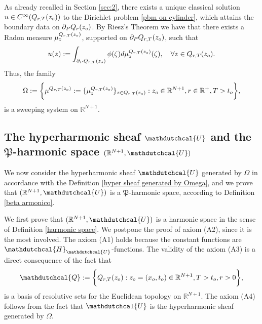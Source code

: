 \documentclass{amsart}
\numberwithin{equation}{section}
\def \p{{\phi}}
\def \r{{\mathbb{R}}}
\def \Hd{{\mathdutchcal{H}}}
\def \Ud{{\mathdutchcal{U}}}
\begin{document}
{As already recalled in Section \ref{sec:2}, there exists a unique classical solution $u \in {C}^\infty ({Q}_{r,T}(z_{\rm o}))$ to the Dirichlet problem \eqref{pbm on cylinder}, which attains the boundary data on $\partial_P {Q}_r(z_{\rm o})$. By Riesz's Theorem we have that there exists a Radon measure $\mu^{{Q}_{r,T}(z_{\rm o})}_z$, supported on $\partial_P{Q}_{r,T}(z_{\rm o})$, such that 
\begin{equation*} %
    u(z):= \int_{\partial_P{Q}_{r,T}(z_{\rm o})}\p(\zeta){\rm d} \mu^{{Q}_{r,T}(z_{\rm o})}_z(\zeta), \quad \forall z \in {Q}_{r,T}(z_{\rm o}).
\end{equation*}
Thus, the family
\begin{equation} \label{sweep}
	\Omega := \biggl\{ \mu^{{Q}_{r,T}(z_{\rm o})}:=\{\mu^{{Q}_{r,T}(z_{\rm o})}_z\}_{z \in {Q}_{r,T}(z_{\rm o})}:	z_{\rm o} \in \r^{N+1},r\in \r^+, T >t_{\rm o}\biggl\},
\end{equation}
is a sweeping system on $\r^{N+1}$. 

\subsection{The hyperharmonic sheaf $\Ud$ and the $\mathfrak{P}$-harmonic space $(\r^{N+1},\Ud)$}


We now consider the hyperharmonic sheaf $\Ud$ generated by $\Omega$ in accordance with the Definition \ref{hyper sheaf generated by Omega}, and we prove that $(\r^{N+1},\Ud)$ is a $\mathfrak{P}$-harmonic space, according to Definition \ref{beta armonico}. 

We first prove that $(\r^{N+1},\Ud)$ is a harmonic space in the sense of Definition \ref{harmonic space}. We postpone the proof of  axiom {\rm (A2)}, since it is the most involved. The axiom {\rm (A1)} holds because the constant functions are $\Hd_{\Ud}$-functions. The validity of the axiom {\rm (A3)} is a direct consequence of the fact that 
$$
	\mathdutchcal{Q}:= \biggl\{{Q}_{r,T}(z_{\rm o}): z_{\rm o} = (x_{\rm o},t_{\rm o}) \in \r^{N+1}, T> t_{\rm o}, r >0 \biggr\},
$$
is a basis of resolutive sets for the Euclidean topology on $\r^{N+1}$. The axiom {\rm (A4)} follows from the fact that $\Ud$ is the hyperharmonic sheaf generated by $\Omega$. 

}
\end{document}
